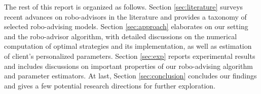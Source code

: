The rest of this report is organized as follows. Section \ref{sec:literature} surveys recent advances on robo-advisors in the literature and provides a taxonomy of selected robo-advising models. Section \ref{sec:approach} elaborates on our setting and the robo-advisor algorithm, with detailed discussions on the numerical computation of optimal strategies and its implementation, as well as estimation of client's personalized parameters. Section \ref{sec:exp} reports experimental results and includes discussions on important properties of our robo-advising algorithm and parameter estimators. At last, Section \ref{sec:conclusion} concludes our findings and gives a few potential research directions for further exploration.